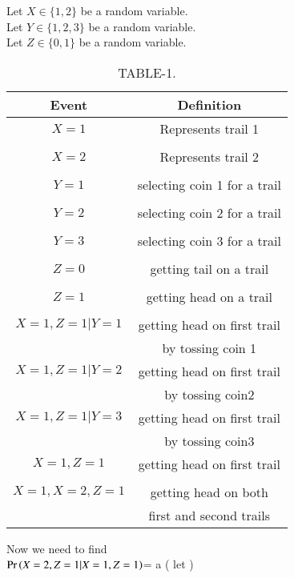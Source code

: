 
Let $X \in \{1,2\}$ be a random variable.
\\Let  $Y \in \{1,2,3\}$ be a random variable.
\\Let $Z \in \{0,1\}$ be a random variable.
\begin{table}[h!]
 \resizebox{\columnwidth}{!}
    {
    \begin{tabular}{|c|c|}
    \hline
        Event & Definition \\
         \hline
         $X=1$ & Represents trail 1\\&\\
         \hline
         $X=2$ & Represents trail 2\\&\\
         \hline
         $Y=1$ & selecting coin 1 for a trail\\&\\
         \hline
         $Y=2$ & selecting coin 2 for a trail\\&\\
         \hline
         $Y=3$ & selecting coin 3 for a trail\\&\\
         \hline
         $Z=0$ & getting tail on a trail\\&\\
         \hline
         $Z=1$ & getting head on a trail\\&\\
         \hline 
         $X=1,Z=1|Y=1$ & getting head on first trail
         \\ & by tossing coin 1\\
         \hline
         $X=1,Z=1|Y=2$ & getting head on first trail
         \\ & by tossing coin2 \\
         \hline
         $X=1,Z=1|Y=3$ & getting head on first trail
         \\ & by tossing coin3 \\
         \hline
         $X=1,Z=1$ & getting head on first trail\\&\\
         \hline
         $X=1,X=2,Z=1$ & getting head on both \\ &first and second trails\\
         \hline
    \end{tabular}
    }
    \caption{\label{ec2021-7:tab:table-1}TABLE-1.}
\end{table}
Now we need to find\\ $\Pr\left(X=2,Z=1|X=1,Z=1\right)$= a ( let )
